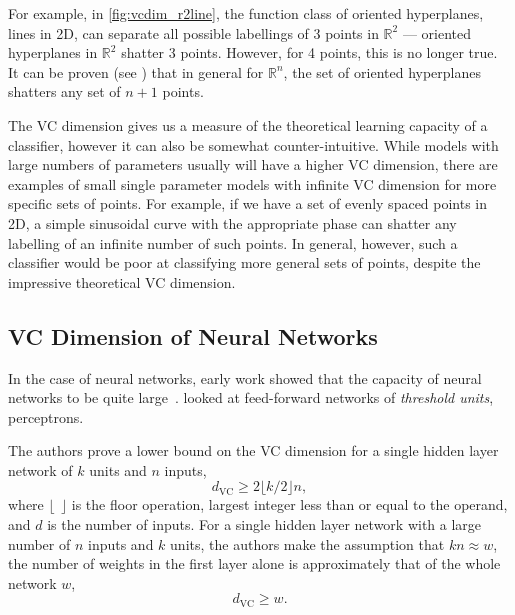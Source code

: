 \documentclass[thesis]{subfiles}
\begin{document}
    For example, in \cref{fig:vcdim_r2line}, the function class of oriented hyperplanes, \ie lines in 2D, can separate all possible labellings of 3 points in $\mathbb{R}^2$ --- oriented hyperplanes in $\mathbb{R}^2$ shatter 3 points. However, for 4 points, this is no longer true. It can be proven (see \citet{burges1998tutorial}) that in general for $\mathbb{R}^n$, the set of oriented hyperplanes shatters any set of $n+1$ points.

    The VC dimension gives us a measure of the theoretical learning capacity of a classifier, however it can also be somewhat counter-intuitive. While models with large numbers of parameters usually will have a higher VC dimension, there are examples of small single parameter models with infinite VC dimension for more specific sets of points. For example, if we have a set of evenly spaced points in 2D, a simple sinusoidal curve with the appropriate phase can shatter any labelling of an infinite number of such points. In general, however, such a classifier would be poor at classifying more general sets of points, despite the impressive theoretical VC dimension.
    
    \subsection{VC Dimension of Neural Networks}
    In the case of neural networks, early work showed that the capacity of neural networks to be quite large~\citep{hornik89a,baum1989size}. \citet{baum1989size} looked at feed-forward networks of \emph{threshold units}, \ie perceptrons. %
    
    The authors prove a lower bound on the VC dimension for a single hidden layer network of $k$ units and $n$ inputs,
    \begin{equation}
        d_{\textrm{VC}} \geq 2 \lfloor k/2 \rfloor n,
    \end{equation}
    where $\lfloor \ \ \rfloor$ is the floor operation, \ie largest integer less than or equal to the operand, and $d$ is the number of inputs. For a single hidden layer network with a large number of $n$ inputs and $k$ units, the authors make the assumption that $kn\approx w$, \ie the number of weights in the first layer alone is approximately that of the whole network $w$,
    \begin{equation}
        d_{\textrm{VC}} \geq w.
    \end{equation}
\end{document}

